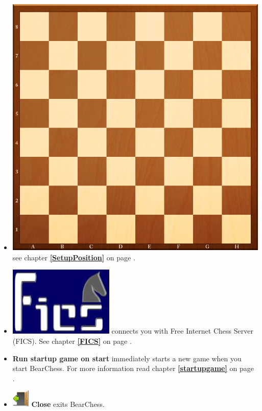 \documentclass[11pt,a4paper]{article}
\begin{document}
\begin{itemize}
		\item \includegraphics[scale=0.03]{Chess_Board.png} see chapter \textbf{\ref{SetupPosition}  } on page \pageref{SetupPosition}.
		
		\item \includegraphics[scale=0.1]{FicsLogo.png} connects you with Free Internet Chess Server (FICS). See chapter \textbf{\ref{FICS}  } on page \pageref{FICS}.	
		
		\item \textbf{Run startup game on start} immediately starts a new game when you start BearChess. For more information read chapter \textbf{\ref{startupgame}  } on page \pageref{startupgame}.
		
		\item \includegraphics[scale=0.5]{door_out.png} \textbf{Close} exits BearChess.
	\end{itemize}
	
\end{document}
